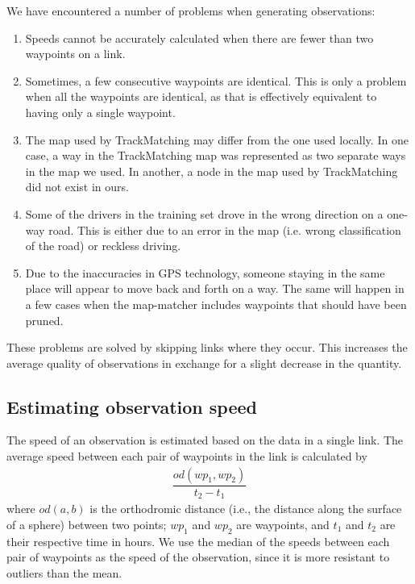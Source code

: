 We have encountered a number of problems when generating observations:

\begin{enumerate}
	\item Speeds cannot be accurately calculated when there are fewer than two waypoints on a link.
	\item Sometimes, a few consecutive waypoints are identical. This is only a problem when all the waypoints are identical, as that is effectively equivalent to having only a single waypoint.
	\item The map used by TrackMatching may differ from the one used locally. In one case, a way in the TrackMatching map was represented as two separate ways in the map we used. In another, a node in the map used by TrackMatching did not exist in ours.
	\item Some of the drivers in the training set drove in the wrong direction on a one-way road. This is either due to an error in the map (i.e. wrong classification of the road) or reckless driving.
	\item Due to the inaccuracies in GPS technology, someone staying in the same place will appear to move back and forth on a way. The same will happen in a few cases when the map-matcher includes waypoints that should have been pruned.
\end{enumerate}

These problems are solved by skipping links where they occur. This increases the average quality of observations in exchange for a slight decrease in the quantity.

\subsection{Estimating observation speed}\label{KR:speed} 
The speed of an observation is estimated based on the data in a single link. The average speed between each pair of waypoints in the link is calculated by
\begin{align*}
\dfrac{od(wp_1, wp_2)}{t_2 - t_1}
\end{align*}
where $od(a, b)$ is the orthodromic distance (i.e., the distance along the surface of a sphere) between two points; $wp_1$ and $wp_2$ are waypoints, and $t_1$ and $t_2$ are their respective time in hours. We use the median of the speeds between each pair of waypoints as the speed of the observation, since it is more resistant to outliers than the mean.

